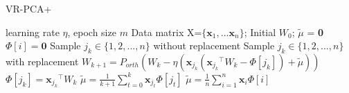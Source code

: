 \documentclass[runningheads,a4paper]{llncs}
\begin{document}
 
   \begin{algorithm}[t]
 	\caption{\textsc{VR-PCA+}}
 	\label{VR-PCA+}
	\begin{algorithmic}[1]
	\Require learning rate $\eta$, epoch size $m$
	\Input Data matrix X=$\{\mathbf{x}_1, ... \mathbf{x}_n\}$; Initial $W_0$; $\tilde{\mu}$ = \textbf{0}
		\State $\Phi[i] = \textbf{0}$
	\EndFor
		\State Sample $j_k \in \{1, 2, ... ,n\}$ without replacement
		\Else
		\State Sample $j_k \in \{1, 2, ... ,n\}$ with replacement
		\EndIf
		\State $W_{k+1} = P_{orth}(W_k - \eta(\mathbf{x}_{j_k}({\mathbf{x}_{j_k}}^{\top}W_k - \Phi[{j_k}]) + \tilde{\mu}))$
		\State $\Phi[{j_k}] = {\mathbf{x}_{j_k}}^{\top}W_k$
		\State $\tilde{\mu} = \frac{1}{k+1} \sum\limits_{t=0}^{k}\mathbf{x}_{j_t}\Phi[j_t]$
		\Else
		\State $\tilde{\mu} = \frac{1}{n} \sum\limits_{i=1}^{n}\mathbf{x}_{i}\Phi[i]$
		\EndIf
	\EndFor
	\end{algorithmic}
\end{algorithm}
\end{document}
